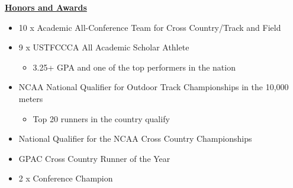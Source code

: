 \documentclass[10pt]{article}
\begin{document}
\underline{\textbf{Honors and Awards}}

\begin{itemize}
\item 10 x Academic All-Conference Team for Cross Country/Track and Field
\item 9 x USTFCCCA All Academic Scholar Athlete
\begin{itemize}
\item 3.25+ GPA and one of the top performers in the nation
\end{itemize}
\item NCAA National Qualifier for Outdoor Track Championships in the 10,000 meters
\begin{itemize}
\item Top 20 runners in the country qualify
\end{itemize}
\item National Qualifier for the NCAA Cross Country Championships
\item GPAC Cross Country Runner of the Year
\item 2 x Conference Champion
\end{itemize}
\end{document}
